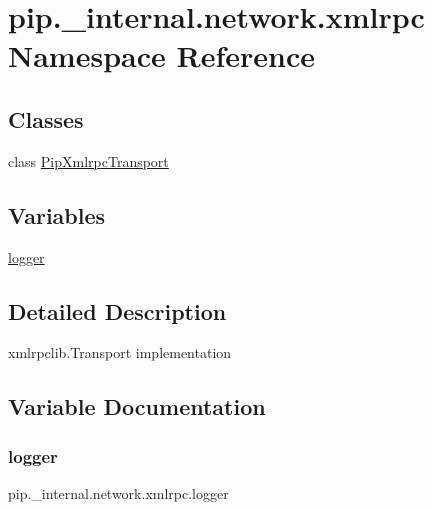 \hypertarget{namespacepip_1_1__internal_1_1network_1_1xmlrpc}{}\section{pip.\+\_\+internal.\+network.\+xmlrpc Namespace Reference}
\label{namespacepip_1_1__internal_1_1network_1_1xmlrpc}
\subsection*{Classes}
\begin{DoxyCompactItemize}
\item 
class \hyperlink{classpip_1_1__internal_1_1network_1_1xmlrpc_1_1PipXmlrpcTransport}{Pip\+Xmlrpc\+Transport}
\end{DoxyCompactItemize}
\subsection*{Variables}
\begin{DoxyCompactItemize}
\item 
\hyperlink{namespacepip_1_1__internal_1_1network_1_1xmlrpc_a0a96466a3f2a9b2dc4fd0b4928f97558}{logger}
\end{DoxyCompactItemize}


\subsection{Detailed Description}
\begin{DoxyVerb}xmlrpclib.Transport implementation
\end{DoxyVerb}
 

\subsection{Variable Documentation}
\mbox{\label{namespacepip_1_1__internal_1_1network_1_1xmlrpc_a0a96466a3f2a9b2dc4fd0b4928f97558}} 
\subsubsection{\texorpdfstring{logger}{logger}}
{\footnotesize\ttfamily pip.\+\_\+internal.\+network.\+xmlrpc.\+logger}

